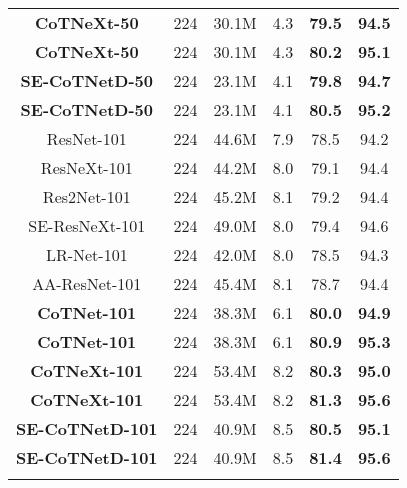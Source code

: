 \documentclass[10pt,twocolumn,letterpaper]{article}
\begin{document}
\begin{table}[!tb]
\begin{tabular}{c|c|cc|cc}
\textbf{CoTNeXt-50}                                     & 224  & 30.1M  & 4.3    & \textbf{79.5}  & \textbf{94.5}  \\
\textbf{CoTNeXt-50}                             & 224  & 30.1M  & 4.3    & \textbf{80.2}  & \textbf{95.1}  \\
\textbf{SE-CoTNetD-50}                                  & 224  & 23.1M  & 4.1    & \textbf{79.8}  & \textbf{94.7}  \\
\textbf{SE-CoTNetD-50}                          & 224  & 23.1M  & 4.1    & \textbf{80.5}  & \textbf{95.2}  \\\hline\hline
ResNet-101 \cite{he2016deep}                            & 224  & 44.6M  & 7.9    & 78.5       & 94.2       \\
ResNeXt-101 \cite{xie2017aggregated}                    & 224  & 44.2M  & 8.0    & 79.1       & 94.4       \\
Res2Net-101 \cite{gao2019res2net}                       & 224  & 45.2M  & 8.1    & 79.2       & 94.4       \\
SE-ResNeXt-101 \cite{hu2018squeeze}                     & 224  & 49.0M  & 8.0    & 79.4       & 94.6        \\
LR-Net-101  \cite{hu2019local}                          & 224  & 42.0M  & 8.0    & 78.5       & 94.3       \\
AA-ResNet-101 \cite{bello2019attention}                 & 224  & 45.4M  & 8.1    & 78.7       & 94.4       \\ \hline
\textbf{CoTNet-101}                                     & 224  & 38.3M  & 6.1    & \textbf{80.0}  & \textbf{94.9}  \\
\textbf{CoTNet-101}                             & 224  & 38.3M  & 6.1    & \textbf{80.9}  & \textbf{95.3}  \\
\textbf{CoTNeXt-101}                                    & 224  & 53.4M  & 8.2    & \textbf{80.3}  & \textbf{95.0}  \\
\textbf{CoTNeXt-101}                            & 224  & 53.4M  & 8.2    & \textbf{81.3}  & \textbf{95.6}  \\
\textbf{SE-CoTNetD-101}                                 & 224  & 40.9M  & 8.5    & \textbf{80.5}  & \textbf{95.1}  \\
\textbf{SE-CoTNetD-101}                         & 224  & 40.9M  & 8.5    & \textbf{81.4}  & \textbf{95.6}  \\ \Xhline{2\arrayrulewidth}
\end{tabular}
\vspace{-0.26in}
\label{table:r1}
\end{table}
\end{document}
